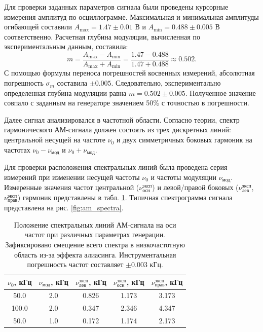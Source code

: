 \documentclass[reprint, amsmath, amssymb, aps, pra, nofootinbib]{revtex4-2}
\begin{document}
Для проверки заданных параметров сигнала были проведены курсорные измерения амплитуд по осциллограмме. Максимальная и минимальная амплитуды огибающей составили $A_{\text{max}} = 1.47 \pm 0.01$ В и $A_{\text{min}} = 0.488 \pm 0.005$ В соответственно. Расчетная глубина модуляции, вычисленная по экспериментальным данным, составила:
\begin{equation}
    m = \frac{A_{\text{max}} - A_{\text{min}}}{A_{\text{max}} + A_{\text{min}}} = \frac{1.47 - 0.488}{1.47 + 0.488} \approx 0.502.
\end{equation}
С помощью формулы переноса погрешностей косвенных измерений, абсолютная погрешность $\sigma_m$ составила $\pm 0.005$. Следовательно, экспериментально определенная глубина модуляции равна $m = 0.502 \pm 0.005$. Полученное значение совпало с заданным на генераторе значением 50\% с точностью в погрешности.

Далее сигнал анализировался в частотной области. Согласно теории, спектр гармонического АМ-сигнала должен состоять из трех дискретных линий: центральной несущей на частоте $\nu_0$ и двух симметричных боковых гармоник на частотах $\nu_0 - \nu_{\text{мод}}$ и $\nu_0 + \nu_{\text{мод}}$. 

Для проверки расположения спектральных линий была проведена серия измерений при изменении несущей частоты $\nu_0$ и частоты модуляции $\nu_{\text{мод}}$. Измеренные значения частот центральной ($\nu_{\text{осн}}^{\text{эксп}}$) и левой/правой боковых ($\nu_{\text{лев}}^{\text{эксп}}$, $\nu_{\text{прав}}^{\text{эксп}}$) гармоник представлены в табл. \ref{tab:am_freq}. Типичная спектрограмма сигнала представлена на рис. \ref{fig:am_spectra}.

\begin{table}[ht!]
    \caption{Положение спектральных линий АМ-сигнала на оси частот при различных параметрах генерации. Зафиксировано смещение всего спектра в низкочастотную область из-за эффекта алиасинга. Инструментальная погрешность частот составляет $\pm 0.003$ кГц.}
    \label{tab:am_freq}
    \centering
    \begin{ruledtabular}
    \begin{tabular}{ccccc}
        $\nu_0$, кГц & $\nu_{\text{мод}}$, кГц & $\nu_{\text{лев}}^{\text{эксп}}$, кГц & $\nu_{\text{осн}}^{\text{эксп}}$, кГц & $\nu_{\text{прав}}^{\text{эксп}}$, кГц \\
        \hline
        50.0  & 2.0 & 0.826 & 1.173 & 3.173 \\
        100.0 & 2.0 & 0.347 & 2.346 & 4.347 \\
        50.0  & 1.0 & 0.172 & 1.174 & 2.173 \\
    \end{tabular}
    \end{ruledtabular}
\end{table}
\end{document}
